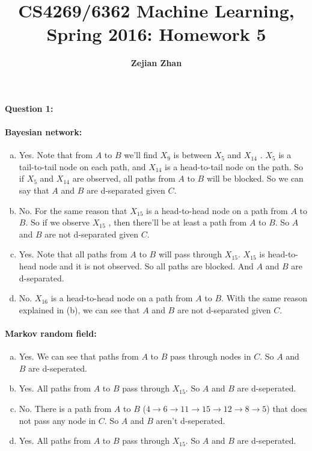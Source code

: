 \documentclass[letterpaper,11pt]{article}
\title{CS4269/6362 Machine Learning, Spring 2016: Homework 5}
\date{}
\author{\bf Zejian Zhan}
\begin{document}
\maketitle


\paragraph{Question 1:}
\paragraph{Bayesian network: }
\begin{enumerate}[(a)]
\item Yes. Note that from $A$ to $B$ we'll find $X_9$ is between $X_5$ and $X_{14}$ . $X_5$ is a tail-to-tail node on each path, and $X_{14}$ is a head-to-tail node on the path. So if $X_5$ and $X_{14}$ are observed, all paths from $A$ to $B$ will be blocked. So we can say that $A$ and $B$ are d-separated given $C$.
\item No. For the same reason that $X_{15}$ is a head-to-head node on a path from $A$ to $B$. So if we observe $X_{15}$ , then there'll be at least a path from $A$ to $B$. So $A$ and $B$ are not d-separated given $C$.
\item Yes. Note that all paths from $A$ to $B$ will pass through $X_{15}$. $X_{15}$ is head-to-head node and it is not observed. So all paths are blocked. And $A$ and $B$ are d-separated.
\item No. $X_{16}$ is a head-to-head node on a path from $A$ to $B$. With the same reason explained in (b), we can see that $A$ and $B$ are not d-separated given $C$.
\end{enumerate}
\paragraph{Markov random field: }
\begin{enumerate}[(a)]
\item Yes. We can see that paths from $A$ to $B$ pass through nodes in $C$. So $A$ and $B$ are d-seperated.
\item Yes. All paths from $A$ to $B$ pass through $X_{15}$. So $A$ and $B$ are d-seperated.
\item No. There is a path from $A$ to $B$ ($4\rightarrow6\rightarrow11\rightarrow15\rightarrow12\rightarrow8\rightarrow5$) that does not pass any node in $C$. So $A$ and $B$ aren't d-seperated.
\item Yes. All paths from $A$ to $B$ pass through $X_{15}$.  So $A$ and $B$ are d-seperated.
\end{enumerate}
\end{document}
